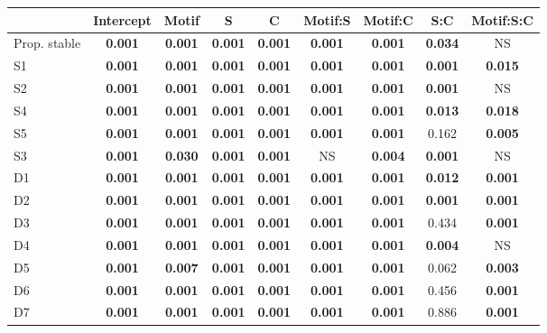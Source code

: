 \documentclass[12pt]{article}
\begin{document}
\begin{table}[h!]
\begin{tabular}{m{1.5cm} | c c  c c  c c  c c |}
		&	Intercept	&	Motif	& S	& C	&	Motif:S	&	Motif:C	&	S:C	&	Motif:S:C \\
		\hline
		Prop. stable	&	\textbf{0.001}	&	\textbf{0.001}	&	\textbf{0.001}	&	\textbf{0.001}	&	\textbf{0.001}	&	\textbf{0.001}	&	\textbf{0.034}	&	NS	\\
		\hline
		S1 & \textbf{0.001}	& \textbf{0.001} & \textbf{0.001} &	\textbf{0.001} & \textbf{0.001}	& \textbf{0.001} &	\textbf{0.001} & \textbf{0.015}	\\
		S2 & \textbf{0.001} & \textbf{0.001} & \textbf{0.001} &	\textbf{0.001} & \textbf{0.001}	& \textbf{0.001} & \textbf{0.001}	&	NS	\\
		S4 & \textbf{0.001}	& \textbf{0.001} &	\textbf{0.001}	& \textbf{0.001} &	\textbf{0.001}	& \textbf{0.001} & \textbf{0.013} &	\textbf{0.018}	\\
		S5 & \textbf{0.001}	& \textbf{0.001} &	\textbf{0.001}	&	\textbf{0.001} & \textbf{0.001}	& \textbf{0.001} & 0.162 & \textbf{0.005}	\\
			\hline
		S3		&	\textbf{0.001}		&	\textbf{0.030}	&	\textbf{0.001}	&	\textbf{0.001}	&	NS	&	\textbf{0.004}	&	\textbf{0.001}	&	NS	\\
		D1		& \textbf{0.001} &	\textbf{0.001}	&	\textbf{0.001}	&	\textbf{0.001}	&	\textbf{0.001}	&	\textbf{0.001}	& \textbf{0.012} & \textbf{0.001} \\
		D2		&	\textbf{0.001} &	\textbf{0.001}	& \textbf{0.001} &	\textbf{0.001}	& \textbf{0.001} &	\textbf{0.001}	& \textbf{0.001} &	\textbf{0.001}	\\
		D3		&	\textbf{0.001}		&	\textbf{0.001}	&	\textbf{0.001} & \textbf{0.001}	& \textbf{0.001} &	\textbf{0.001} &	0.434	& \textbf{0.001}	\\
		D4		&	\textbf{0.001}	&	\textbf{0.001}	&	\textbf{0.001} & \textbf{0.001}	&	\textbf{0.001}	&	\textbf{0.001}	&	\textbf{0.004}	&	NS	\\
		D5		&	\textbf{0.001}	&	\textbf{0.007}	&	\textbf{0.001}	&	\textbf{0.001} & \textbf{0.001}	& \textbf{0.001} &	0.062 &	\textbf{0.003}	\\
		D6		&	\textbf{0.001} & \textbf{0.001}	&	\textbf{0.001} &	\textbf{0.001}	&	\textbf{0.001}	&	\textbf{0.001}	&	0.456	&	\textbf{0.001}	\\
		D7		&	\textbf{0.001}	&	\textbf{0.001}	&	\textbf{0.001}	& \textbf{0.001} &	\textbf{0.001}	&	\textbf{0.001}	&	0.886	&	\textbf{0.001}	\\
		\hline
		\end{tabular}
		\end{table}
\end{document}
